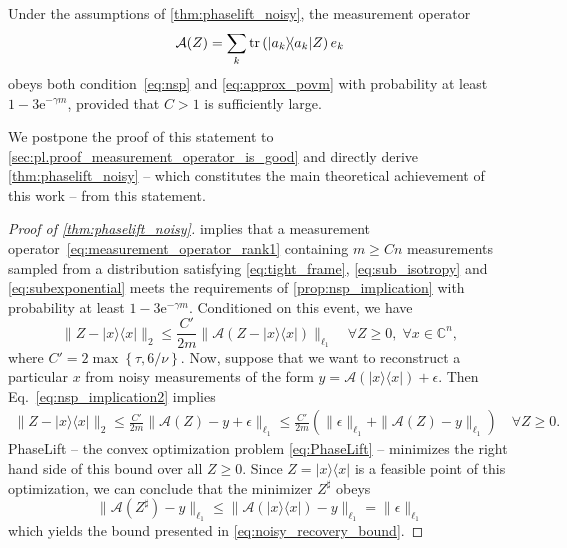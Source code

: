 \begin{proposition} \label{prop:RECR_nsp}
  Under the assumptions of \cref{thm:phaselift_noisy}, the measurement operator
  \begin{equation}
    \label{eq:measurement_operator_rank1}
    \mathcal{A}( Z) = \sum_k \tr \left(\ket{ a_k}\bra{ a_k}  Z\right)  e_k
  \end{equation}
  obeys both condition~\eqref{eq:nsp} and \eqref{eq:approx_povm} with probability at least $1- 3\mathrm{e}^{-\gamma m}$, provided that $C >1$ is sufficiently large.
\end{proposition}

We postpone the proof of this statement to \cref{sec:pl.proof_measurement_operator_is_good} and directly derive \cref{thm:phaselift_noisy} -- which constitutes the main theoretical achievement of this work -- from this statement.

\begin{proof}[Proof of \cref{thm:phaselift_noisy}]
 implies that a measurement operator~\eqref{eq:measurement_operator_rank1} containing $m \geq C n$ measurements sampled from a distribution satisfying \eqref{eq:tight_frame}, \eqref{eq:sub_isotropy} and \eqref{eq:subexponential} meets the requirements of \cref{prop:nsp_implication} with probability at least $1-3 \mathrm{e}^{-\gamma m}$.
Conditioned on this event, we have
\begin{equation}
\|  Z - |{x} \rangle \! \langle {x}| \|_2 \leq \frac{C'}{2m}  \| \mathcal{A}( Z - |{x} \rangle \! \langle {x}|) \|_{\ell_1} \quad \forall  Z \geq 0,\; \forall {x} \in \mathbb{C}^n,
\label{eq:nsp_implication2}
\end{equation}
where $C' = 2 \max \left\{\tau, 6/\nu \right\}$.
Now, suppose that we want to reconstruct a particular ${x}$ from noisy measurements of the form ${y} = \mathcal{A} (|{x} \rangle \! \langle {x}|) + {\epsilon}$. Then Eq.~\eqref{eq:nsp_implication2} implies
\begin{align}
\|  Z - |{x} \rangle \! \langle {x}| \|_2 \leq \frac{C'}{2m} \| \mathcal{A}( Z) - {y} + {\epsilon} \|_{\ell_1}
\leq \frac{C'}{2m} \left( \| {\epsilon} \|_{\ell_1} + \| \mathcal{A}( Z) - {y} \|_{\ell_1} \right)\quad \forall  Z \geq 0.
\end{align}
PhaseLift -- the convex optimization problem \eqref{eq:PhaseLift} -- minimizes the right hand side of this bound over all $ Z \geq 0$. Since $ Z = |{x} \rangle \! \langle {x}|$ is a feasible point of this optimization, we can conclude that the minimizer $ Z^\sharp$ obeys
\[
\| \mathcal{A}( Z^\sharp) - {y} \|_{\ell_1} \leq \| \mathcal{A}(|{x} \rangle \! \langle {x}|)-{y} \|_{\ell_1} = \| {\epsilon} \|_{\ell_1}
\]
which yields the bound presented in \eqref{eq:noisy_recovery_bound}.
\end{proof}


